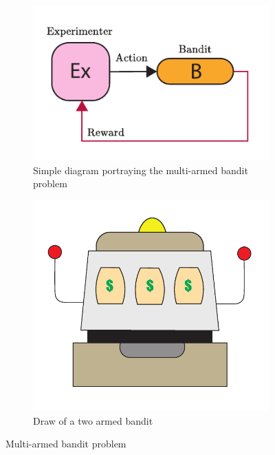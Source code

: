 \documentclass[11pt,a4paper,twoside]{report}
\newcommand{\+}{\textnormal{+} }
\theoremstyle{definition}
\numberwithin{equation}{chapter}
\begin{document}
\begin{figure}[t]
  \centering
  \begin{subfigure}{.5\textwidth}
    \centering
    \includegraphics[width=1\linewidth]{figures/Bandit.pdf}
    \caption{Simple diagram portraying the multi-armed bandit problem}
  \end{subfigure}
  \begin{subfigure}{.5\textwidth}
    \centering
    \includegraphics[width=1\linewidth]{figures/Bandit-Draw.pdf}
    \caption{Draw of a two armed bandit}
  \end{subfigure}
  \caption{Multi-armed bandit problem}
  \end{figure}
\end{document}
